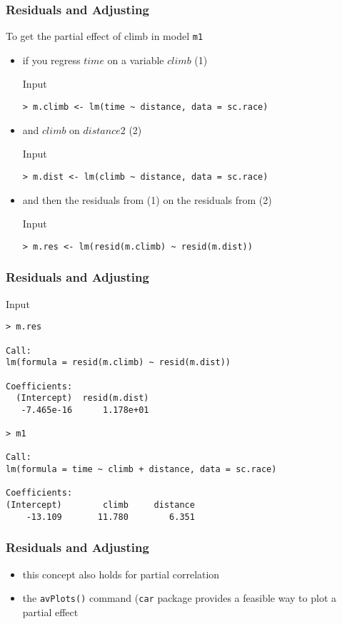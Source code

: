 \begin{frame}[fragile]\frametitle{Residuals and Adjusting}
  To get the partial effect of climb in model \texttt{m1}
  \begin{itemize}
  \item if you regress $time$ on a variable $climb$ (1)
    \begin{exampleblock}{Input}
\begin{verbatim}
> m.climb <- lm(time ~ distance, data = sc.race)
\end{verbatim}
    \end{exampleblock}
  \item and $climb$ on $distance2$ (2)
\begin{exampleblock}{Input}
\begin{verbatim}
> m.dist <- lm(climb ~ distance, data = sc.race)
\end{verbatim}
\end{exampleblock}
  \item and then the residuals from (1) on the residuals from (2)
\begin{exampleblock}{Input}
\begin{verbatim}
> m.res <- lm(resid(m.climb) ~ resid(m.dist))
\end{verbatim}
\end{exampleblock}
\end{itemize}
\end{frame}

\begin{frame}[fragile]\frametitle{Residuals and Adjusting}
\begin{exampleblock}{Input}\scriptsize
\begin{verbatim}
> m.res

Call:
lm(formula = resid(m.climb) ~ resid(m.dist))

Coefficients:
  (Intercept)  resid(m.dist)  
   -7.465e-16      1.178e+01  

> m1

Call:
lm(formula = time ~ climb + distance, data = sc.race)

Coefficients:
(Intercept)        climb     distance  
    -13.109       11.780        6.351  
\end{verbatim}
    \end{exampleblock}
\end{frame}



\begin{frame}\frametitle{Residuals and Adjusting}
  \begin{itemize}
  \item this concept also holds for partial correlation
  \item the \texttt{avPlots()} command (\texttt{car} package provides a feasible way to plot a partial effect
  \end{itemize}
\end{frame}



